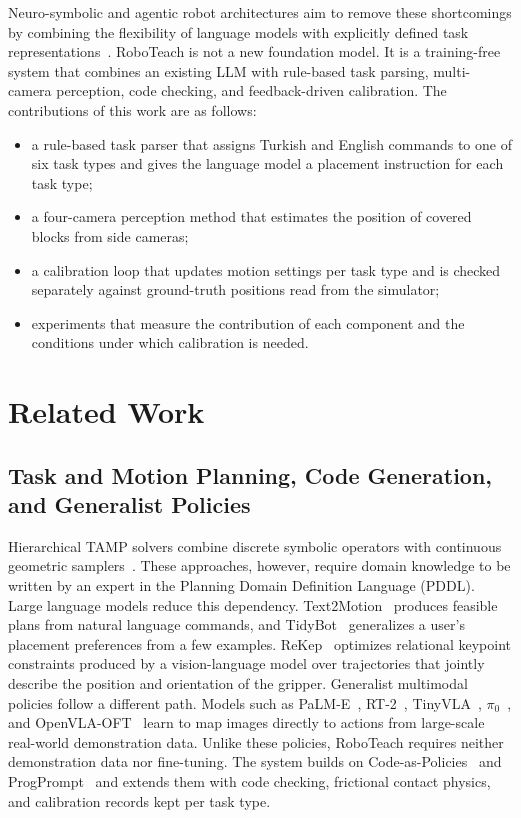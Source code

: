 \documentclass[preprint,12pt]{elsarticle}
\begin{document}
Neuro-symbolic and agentic robot architectures aim to remove these shortcomings by combining the flexibility of language models with explicitly defined task representations~\cite{marra2024neurosymbolic,frering2025bdi,zhao2026agentic}. RoboTeach is not a new foundation model. It is a training-free system that combines an existing LLM with rule-based task parsing, multi-camera perception, code checking, and feedback-driven calibration. The contributions of this work are as follows:
\begin{itemize}[leftmargin=*]
\item a rule-based task parser that assigns Turkish and English commands to one of six task types and gives the language model a placement instruction for each task type;
\item a four-camera perception method that estimates the position of covered blocks from side cameras;
\item a calibration loop that updates motion settings per task type and is checked separately against ground-truth positions read from the simulator;
\item experiments that measure the contribution of each component and the conditions under which calibration is needed.
\end{itemize}

\section{Related Work}

\subsection{Task and Motion Planning, Code Generation, and Generalist Policies}

Hierarchical TAMP solvers combine discrete symbolic operators with continuous geometric samplers~\cite{kaelbling2011hpn,garrett2020pddlstream}. These approaches, however, require domain knowledge to be written by an expert in the Planning Domain Definition Language (PDDL). Large language models reduce this dependency. Text2Motion~\cite{lin2023text2motion} produces feasible plans from natural language commands, and TidyBot~\cite{wu2023tidybot} generalizes a user's placement preferences from a few examples. ReKep~\cite{huang2024rekep} optimizes relational keypoint constraints produced by a vision-language model over trajectories that jointly describe the position and orientation of the gripper. Generalist multimodal policies follow a different path. Models such as PaLM-E~\cite{driess2023palme}, RT-2~\cite{zitkovich2023rt2}, TinyVLA~\cite{wen2025tinyvla}, $\pi_0$~\cite{black2025pi0}, and OpenVLA-OFT~\cite{kim2025openvlaoft} learn to map images directly to actions from large-scale real-world demonstration data. Unlike these policies, RoboTeach requires neither demonstration data nor fine-tuning. The system builds on Code-as-Policies~\cite{liang2023cap} and ProgPrompt~\cite{singh2023progprompt} and extends them with code checking, frictional contact physics, and calibration records kept per task type.
\end{document}
